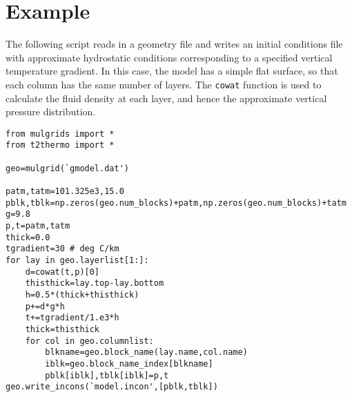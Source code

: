 \section{Example}

The following script reads in a geometry file and writes an initial conditions file with approximate hydrostatic conditions corresponding to a specified vertical temperature gradient.  In this case, the model has a simple flat surface, so that each column has the same number of layers.  The \texttt{cowat} function is used to calculate the fluid density at each layer, and hence the approximate vertical pressure distribution.

\begin{verbatim}
from mulgrids import *
from t2thermo import *

geo=mulgrid(`gmodel.dat')

patm,tatm=101.325e3,15.0
pblk,tblk=np.zeros(geo.num_blocks)+patm,np.zeros(geo.num_blocks)+tatm
g=9.8
p,t=patm,tatm
thick=0.0
tgradient=30 # deg C/km
for lay in geo.layerlist[1:]:
    d=cowat(t,p)[0]
    thisthick=lay.top-lay.bottom
    h=0.5*(thick+thisthick)
    p+=d*g*h
    t+=tgradient/1.e3*h
    thick=thisthick
    for col in geo.columnlist:
        blkname=geo.block_name(lay.name,col.name)
        iblk=geo.block_name_index[blkname]
        pblk[iblk],tblk[iblk]=p,t
geo.write_incons(`model.incon',[pblk,tblk])
\end{verbatim}
